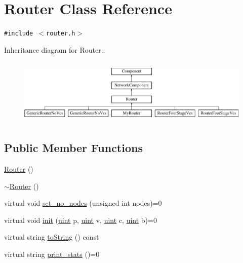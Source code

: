 \hypertarget{classRouter}{
\section{Router Class Reference}
\label{classRouter}
}
{\tt \#include $<$router.h$>$}

Inheritance diagram for Router::\begin{figure}[H]
\begin{center}
\leavevmode
\includegraphics[height=3.2cm]{classRouter}
\end{center}
\end{figure}
\subsection*{Public Member Functions}
\begin{CompactItemize}
\item 
\hyperlink{classRouter_555428efbf07e22776889b8d9b88027f}{Router} ()
\item 
\hyperlink{classRouter_26d13a6259937e330488653e8e16f921}{$\sim$Router} ()
\item 
virtual void \hyperlink{classRouter_33073537e883e8bea1a25690bcb70049}{set\_\-no\_\-nodes} (unsigned int nodes)=0
\item 
virtual void \hyperlink{classRouter_7c551f11fcda9accb02da87c671c4065}{init} (\hyperlink{outputBuffer_8h_91ad9478d81a7aaf2593e8d9c3d06a14}{uint} p, \hyperlink{outputBuffer_8h_91ad9478d81a7aaf2593e8d9c3d06a14}{uint} v, \hyperlink{outputBuffer_8h_91ad9478d81a7aaf2593e8d9c3d06a14}{uint} c, \hyperlink{outputBuffer_8h_91ad9478d81a7aaf2593e8d9c3d06a14}{uint} b)=0
\item 
virtual string \hyperlink{classRouter_1e749a51dcf6cbd6925ac677473c7f58}{toString} () const 
\item 
virtual string \hyperlink{classRouter_75995624d8bd533a9d3eb8c06a62ce07}{print\_\-stats} ()=0
\end{CompactItemize}
